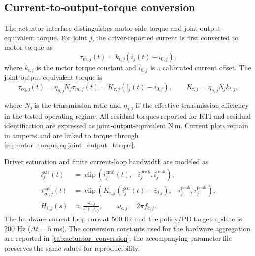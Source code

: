 \documentclass[twoside,final,1p,times]{elsarticle}
\newenvironment{revblock}{}{}
\begin{document}
\subsection{Current-to-output-torque conversion}
\label{subsec:current_torque}
\begin{revblock}
The actuator interface distinguishes motor-side torque and joint-output-equivalent torque. For joint $j$, the driver-reported current is first converted to motor torque as
\begin{equation}
  \tau_{m,j}(t)=k_{t,j}\left(i_j(t)-i_{0,j}\right),
  \label{eq:motor_torque}
\end{equation}
where $k_{t,j}$ is the motor torque constant and $i_{0,j}$ is a calibrated current offset. The joint-output-equivalent torque is
\begin{equation}
  \tau_{\mathrm{eq},j}(t)=\eta_{g,j}N_j\tau_{m,j}(t)=K_{\tau,j}\left(i_j(t)-i_{0,j}\right),\qquad K_{\tau,j}=\eta_{g,j}N_jk_{t,j},
  \label{eq:joint_output_torque}
\end{equation}

where $N_j$ is the transmission ratio and $\eta_{g,j}$ is the effective transmission efficiency in the tested operating regime. All residual torques reported for RTI and residual identification are expressed as joint-output-equivalent N\,m. Current plots remain in amperes and are linked to torque through \cref{eq:motor_torque,eq:joint_output_torque}.



Driver saturation and finite current-loop bandwidth are modeled as
\begin{align}
  i^{\mathrm{sat}}_j(t)&=\operatorname{clip}\left(i^{\mathrm{cmd}}_j(t),-i^{\mathrm{peak}}_j,i^{\mathrm{peak}}_j\right),\label{eq:current_saturation}\\
  \tau^{\mathrm{sat}}_{\mathrm{eq},j}(t)&=\operatorname{clip}\left(K_{\tau,j}(i^{\mathrm{sat}}_j(t)-i_{0,j}),-\tau^{\mathrm{peak}}_j,\tau^{\mathrm{peak}}_j\right),\label{eq:torque_saturation}\\
  H_{i,j}(s)&\approx\frac{\omega_{c,j}}{s+\omega_{c,j}},\qquad \omega_{c,j}=2\pi f_{c,j}.\label{eq:current_loop}
\end{align}
The hardware current loop runs at 500 Hz and the policy/PD target update is 200 Hz ($\Delta t=5$ ms). The conversion constants used for the hardware aggregation are reported in \cref{tab:actuator_conversion}; the accompanying parameter file preserves the same values for reproducibility.


\end{revblock}
\end{document}
